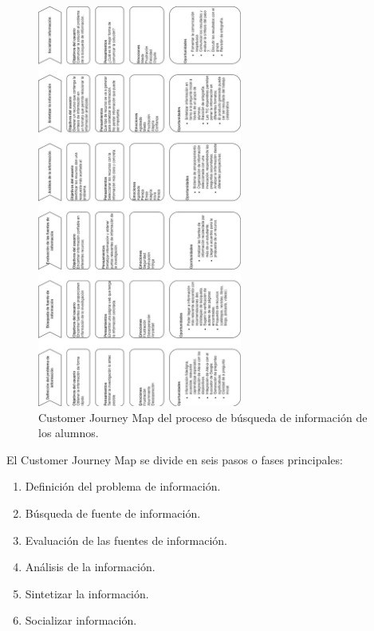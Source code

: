 \begin{figure}[H]
  \centering
  \includegraphics[width=0.60\textwidth]{Cap4/Figuras/Customer Journey Map Skill Rotada.png}
  \caption{Customer Journey Map del proceso de búsqueda de información de los alumnos.}
  \label{fig:415}
\end{figure}

El Customer Journey Map se divide en seis pasos o fases principales:

\begin{enumerate}
  \item Definición del problema de información.
  \item Búsqueda de fuente de información.
  \item Evaluación de las fuentes de información.
  \item Análisis de la información.
  \item Sintetizar la información.
  \item Socializar información.
\end{enumerate}


